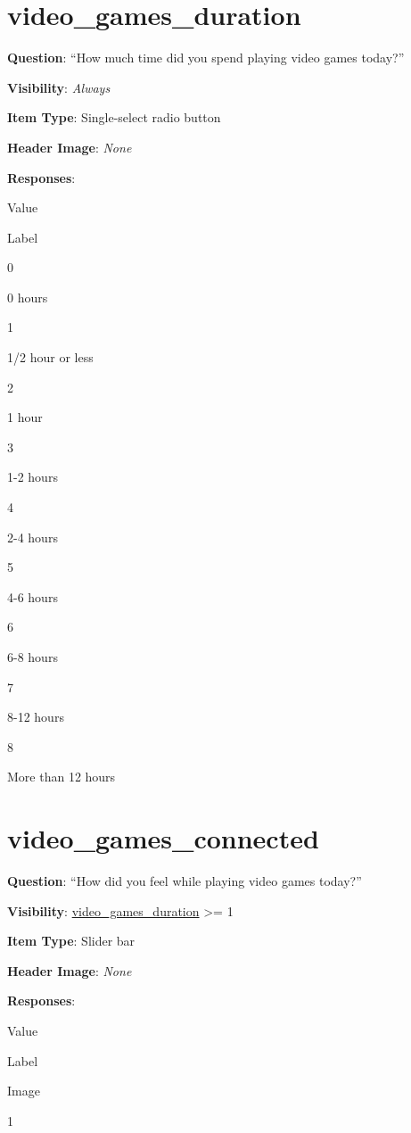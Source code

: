 \documentclass[]{book}
\begin{document}
\hypertarget{video_games_duration}{%
\section{video\_games\_duration}\label{video_games_duration}}

\textbf{Question}: ``How much time did you spend playing video games today?''

\textbf{Visibility}: \emph{Always}

\textbf{Item Type}: Single-select radio button

\textbf{Header Image}: \emph{None}

\textbf{Responses}:

Value

Label

0

0 hours

1

1/2 hour or less

2

1 hour

3

1-2 hours

4

2-4 hours

5

4-6 hours

6

6-8 hours

7

8-12 hours

8

More than 12 hours

\hypertarget{video_games_connected}{%
\section{video\_games\_connected}\label{video_games_connected}}

\textbf{Question}: ``How did you feel while playing video games today?''

\textbf{Visibility}: \protect\hyperlink{video_games_duration}{video\_games\_duration} \textgreater{}= 1

\textbf{Item Type}: Slider bar

\textbf{Header Image}: \emph{None}

\textbf{Responses}:

Value

Label

Image

1
\end{document}
